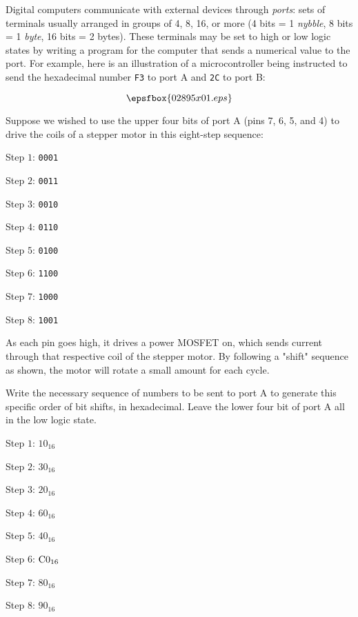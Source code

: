 

Digital computers communicate with external devices through {\it ports}: sets of terminals usually arranged in groups of 4, 8, 16, or more (4 bits = 1 {\it nybble}, 8 bits = 1 {\it byte}, 16 bits = 2 bytes).  These terminals may be set to high or low logic states by writing a program for the computer that sends a numerical value to the port.  For example, here is an illustration of a microcontroller being instructed to send the hexadecimal number {\tt F3} to port A and {\tt 2C} to port B:

$$\epsfbox{02895x01.eps}$$

Suppose we wished to use the upper four bits of port A (pins 7, 6, 5, and 4) to drive the coils of a stepper motor in this eight-step sequence:

\medskip
\goodbreak
\item{Step $1$:} {\tt 0001}
\item{Step $2$:} {\tt 0011}
\item{Step $3$:} {\tt 0010}
\item{Step $4$:} {\tt 0110}
\item{Step $5$:} {\tt 0100}
\item{Step $6$:} {\tt 1100}
\item{Step $7$:} {\tt 1000}
\item{Step $8$:} {\tt 1001}
\medskip

As each pin goes high, it drives a power MOSFET on, which sends current through that respective coil of the stepper motor.  By following a "shift" sequence as shown, the motor will rotate a small amount for each cycle. 

Write the necessary sequence of numbers to be sent to port A to generate this specific order of bit shifts, in hexadecimal.  Leave the lower four bit of port A all in the low logic state.







\medskip
\goodbreak
\item{Step $1$:} $10_{16}$
\item{Step $2$:} $30_{16}$
\item{Step $3$:} $20_{16}$
\item{Step $4$:} $60_{16}$
\item{Step $5$:} $40_{16}$
\item{Step $6$:} $\hbox{C}0_{16}$
\item{Step $7$:} $80_{16}$
\item{Step $8$:} $90_{16}$
\medskip

